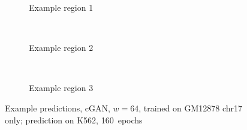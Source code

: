 \begin{figure}[p] %
    \scriptsize{}
    \begin{subfigure}{\textwidth}
        \centering
        \caption{Example  region 1} \label{fig:results:GAN64-17single_r1}
    \end{subfigure}\\[3mm]
    \begin{subfigure}{\textwidth}
        \centering
        \caption{Example region 2} \label{fig:results:GAN64-17single_r2}
    \end{subfigure}\\[3mm]
    \begin{subfigure}{\textwidth}
        \centering
        \caption{Example region 3} \label{fig:results:GAN64-17single_r3}
    \end{subfigure}
    \caption{Example predictions, cGAN, $w=64$, trained on GM12878 chr17 only; prediction on K562, 160~epochs} 
     \label{fig:results:GAN64-17single_matrices}
\end{figure}
\clearpage

